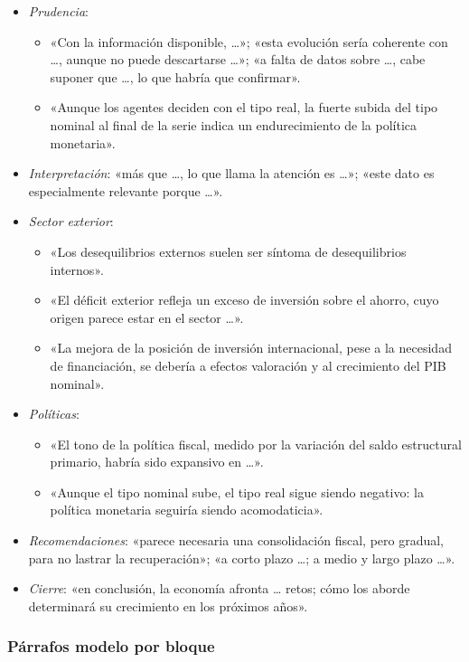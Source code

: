 \documentclass[11pt]{article}
\begin{document}
\begin{itemize}
\begin{itemize}
  \end{itemize}
\item \emph{Prudencia}:
  \begin{itemize}
  \item «Con la información disponible, …»; «esta evolución sería coherente con …, aunque no puede descartarse …»; «a falta de datos sobre …, cabe suponer que …, lo que habría que confirmar».
  \item «Aunque los agentes deciden con el tipo real, la fuerte subida del tipo nominal al final de la serie indica un endurecimiento de la política monetaria».
  \end{itemize}
\item \emph{Interpretación}: «más que …, lo que llama la atención es …»; «este dato es especialmente relevante porque …».
\item \emph{Sector exterior}:
  \begin{itemize}
  \item «Los desequilibrios externos suelen ser síntoma de desequilibrios internos».
  \item «El déficit exterior refleja un exceso de inversión sobre el ahorro, cuyo origen parece estar en el sector …».
  \item «La mejora de la posición de inversión internacional, pese a la necesidad de financiación, se debería a efectos valoración y al crecimiento del PIB nominal».
  \end{itemize}
\item \emph{Políticas}:
  \begin{itemize}
  \item «El tono de la política fiscal, medido por la variación del saldo estructural primario, habría sido expansivo en …».
  \item «Aunque el tipo nominal sube, el tipo real sigue siendo negativo: la política monetaria seguiría siendo acomodaticia».
  \end{itemize}
\item \emph{Recomendaciones}: «parece necesaria una consolidación fiscal, pero gradual, para no lastrar la recuperación»; «a corto plazo …; a medio y largo plazo …».
\item \emph{Cierre}: «en conclusión, la economía afronta … retos; cómo los aborde determinará su crecimiento en los próximos años».
\end{itemize}

\subsubsection{Párrafos modelo por bloque}\label{anexo:parrafos}
\end{document}
